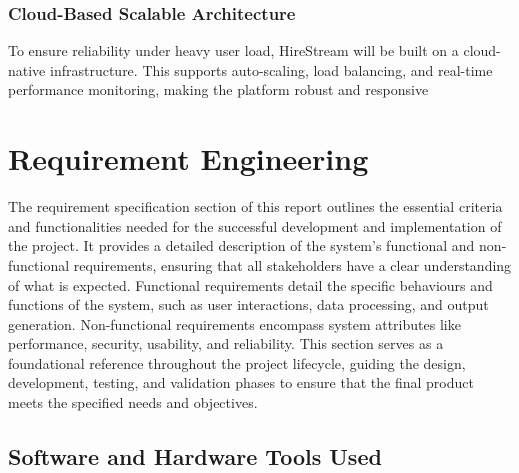 \documentclass[a4paper, 12pt]{report}
\begin{document}
\subsection{Cloud-Based Scalable Architecture}
To ensure reliability under heavy user load, HireStream will be built on a cloud-native infrastructure. This supports auto-scaling, load balancing, and real-time performance monitoring, making the platform robust and responsive



\chapter{Requirement Engineering}

The requirement specification section of this report outlines the essential criteria and functionalities needed for the successful development and implementation of the project. It provides a detailed description of the system's functional and non-functional requirements, ensuring that all stakeholders have a clear understanding of what is expected. Functional requirements detail the specific behaviours and functions of the system, such as user interactions, data processing, and output generation. Non-functional requirements encompass system attributes like performance, security, usability, and reliability. This section serves as a foundational reference throughout the project lifecycle, guiding the design, development, testing, and validation phases to ensure that the final product meets the specified needs and objectives.

\section{Software and Hardware Tools Used}
\end{document}

